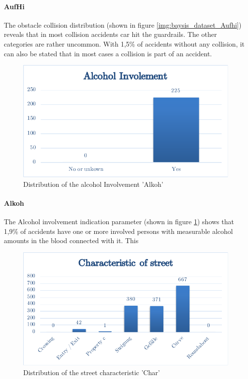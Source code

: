 \documentclass[a4paper,12pt]{report}
\begin{document}
\paragraph{AufHi}
The obstacle collision distribution (shown in figure \ref{img:baysis_dataset_Aufhi}) reveals that in most collision accidents car hit the guardrails. The other categories are rather uncommon. With 1,5\% of accidents without any collision, it can also be stated that in most cases a collision is part of an accident.

\begin{figure}[h]
	\centering
	\includegraphics[scale=0.6]{./assets/baysis_dataset_Alkoh.pdf}
	\caption{Distribution of the alcohol Involvement 'Alkoh'}
	\label{img:baysis_dataset_Alkoh}
\end{figure}

\paragraph{Alkoh}
The Alcohol involvement indication parameter (shown in figure \ref{img:baysis_dataset_Alkoh}) shows that 1,9\% of accidents have one or more involved persons with measurable alcohol amounts in the blood connected with it. This

\begin{figure}[h]
	\centering
	\includegraphics[scale=0.6]{./assets/baysis_dataset_Char.pdf}
	\caption{Distribution of the street characteristic 'Char'}
	\label{img:baysis_dataset_Char}
\end{figure}
\end{document}
